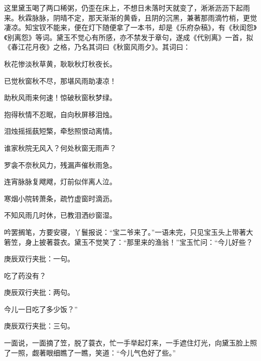 \begin{parag}
    这里黛玉喝了两口稀粥，仍歪在床上，不想日未落时天就变了，淅淅沥沥下起雨来。秋霖脉脉，阴晴不定，那天渐渐的黄昏，且阴的沉黑，兼著那雨滴竹梢，更觉凄凉。知宝钗不能来，便在灯下随便拿了一本书，却是《乐府杂稿》，有《秋闺怨》《别离怨》等词。黛玉不觉心有所感，亦不禁发于章句，遂成《代别离》一首，拟《春江花月夜》之格，乃名其词曰《秋窗风雨夕》。其词曰：
\end{parag}


\begin{poem}
    \begin{pl}

        秋花惨淡秋草黄，耿耿秋灯秋夜长。
    \end{pl}
    \begin{pl}

        已觉秋窗秋不尽，那堪风雨助凄凉！
    \end{pl}
    \begin{pl}

        助秋风雨来何速！惊破秋窗秋梦绿。
    \end{pl}
    \begin{pl}

        抱得秋情不忍眠，自向秋屏移泪烛。
    \end{pl}
    \begin{pl}

        泪烛摇摇蓺短檠，牵愁照恨动离情。
    \end{pl}
    \begin{pl}

        谁家秋院无风入？何处秋窗无雨声？
    \end{pl}
    \begin{pl}

        罗衾不奈秋风力，残漏声催秋雨急。
    \end{pl}
    \begin{pl}

        连宵脉脉复飕飕，灯前似伴离人泣。
    \end{pl}
    \begin{pl}

        寒烟小院转萧条，疏竹虚窗时滴沥。
    \end{pl}
    \begin{pl}

        不知风雨几时休，已教泪洒纱窗湿。
    \end{pl}
\end{poem}


\begin{parag}
    吟罢搁笔，方要安寝，丫鬟报说：“宝二爷来了。”一语未完，只见宝玉头上带著大箬笠，身上披著蓑衣。黛玉不觉笑了：“那里来的渔翁！”宝玉忙问：“今儿好些？\begin{note}庚辰双行夹批：一句。\end{note}吃了药没有？\begin{note}庚辰双行夹批：两句。\end{note}今儿一日吃了多少饭？”\begin{note}庚辰双行夹批：三句。\end{note}一面说，一面摘了笠，脱了蓑衣，忙一手举起灯来，一手遮住灯光，向黛玉脸上照了一照，觑著眼细瞧了一瞧，笑道：“今儿气色好了些。”
\end{parag}


